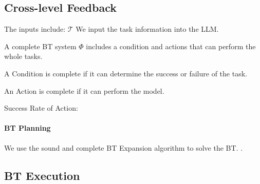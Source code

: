 \documentclass{article}
\begin{document}
\subsection{Cross-level Feedback}










The inputs include: $\mathcal{T}$
We input the task information into the LLM.

A complete BT system $\Phi$ includes a condition and actions that can perform the whole tasks.

A Condition is complete if it can determine the success or failure of the task.

An Action is complete if it can perform the model.




Success Rate of Action:



\paragraph{BT Planning}

We use the sound and complete BT Expansion \cite{cai2021bt} algorithm to solve the BT. . 






\subsection{BT Execution}
\end{document}
